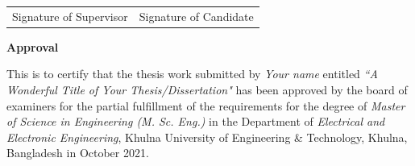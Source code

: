 \documentclass[a4paper,12pt,oneside]{book}
\newcommand{\blanklineR}{\hfill \\} %
\newcommand{\HeadingR}[1]{%
{\large			%
\bfseries{#1}}}
\newcommand{\titleR}{A Wonderful Title of Your Thesis/Dissertation}		%
\begin{document}
\begin{center}
\begin{tabular}{*2c}
\parbox{0.49\textwidth}{\centering Signature of Supervisor} & \parbox{0.49\textwidth}{\centering Signature of Candidate}
\end{tabular}
\end{center}
\newpage
{} \label{approval}
\begin{center}
\HeadingR{Approval}
\blanklineR
\end{center}
This is to certify that the thesis work submitted by \textit{Your name} entitled \textit{``\titleR"} has been approved by the board of examiners for the partial fulfillment of the requirements for the degree of \textit{Master of Science in Engineering (M. Sc. Eng.)} in the Department of \textit{Electrical and Electronic Engineering}, Khulna University of Engineering \& Technology, Khulna, Bangladesh in October 2021.
\end{document}
